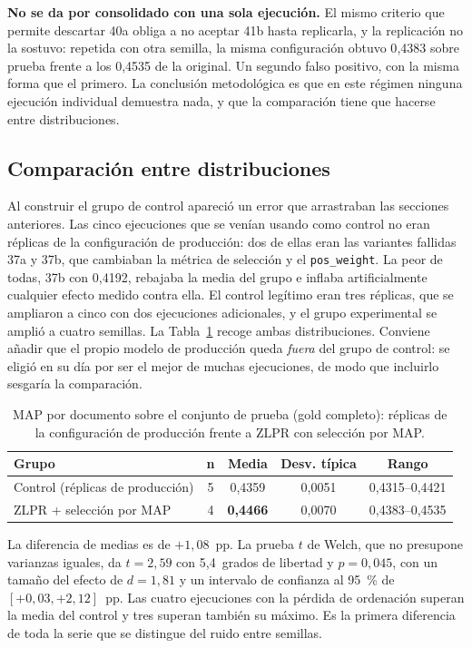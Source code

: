 \textbf{No se da por consolidado con una sola ejecución.} El mismo criterio que permite descartar 40a obliga a no aceptar 41b hasta replicarla, y la replicación no la sostuvo: repetida con otra semilla, la misma configuración obtuvo 0{,}4383 sobre prueba frente a los 0{,}4535 de la original. Un segundo falso positivo, con la misma forma que el primero. La conclusión metodológica es que en este régimen ninguna ejecución individual demuestra nada, y que la comparación tiene que hacerse entre distribuciones.

\subsection{Comparación entre distribuciones}
\label{sec:anexoF-distribuciones}

Al construir el grupo de control apareció un error que arrastraban las secciones anteriores. Las cinco ejecuciones que se venían usando como control no eran réplicas de la configuración de producción: dos de ellas eran las variantes fallidas 37a y 37b, que cambiaban la métrica de selección y el \texttt{pos\_weight}. La peor de todas, 37b con 0{,}4192, rebajaba la media del grupo e inflaba artificialmente cualquier efecto medido contra ella. El control legítimo eran tres réplicas, que se ampliaron a cinco con dos ejecuciones adicionales, y el grupo experimental se amplió a cuatro semillas. La Tabla~\ref{tab:map-distribuciones} recoge ambas distribuciones. Conviene añadir que el propio modelo de producción queda \emph{fuera} del grupo de control: se eligió en su día por ser el mejor de muchas ejecuciones, de modo que incluirlo sesgaría la comparación.

\begin{table}[h]
\centering
\caption{MAP por documento sobre el conjunto de prueba (gold completo): réplicas de la configuración de producción frente a ZLPR con selección por MAP.}
\label{tab:map-distribuciones}
\begin{tabular}{lcccc}
\hline
\textbf{Grupo} & \textbf{n} & \textbf{Media} & \textbf{Desv. típica} & \textbf{Rango} \\
\hline
Control (réplicas de producción) & 5 & 0{,}4359 & 0{,}0051 & 0{,}4315--0{,}4421 \\
ZLPR + selección por MAP & 4 & \textbf{0{,}4466} & 0{,}0070 & 0{,}4383--0{,}4535 \\
\hline
\end{tabular}
\end{table}

La diferencia de medias es de $+1{,}08$~pp. La prueba $t$ de Welch, que no presupone varianzas iguales, da $t = 2{,}59$ con 5{,}4~grados de libertad y $p = 0{,}045$, con un tamaño del efecto de $d = 1{,}81$ y un intervalo de confianza al 95~\% de $[+0{,}03, +2{,}12]$~pp. Las cuatro ejecuciones con la pérdida de ordenación superan la media del control y tres superan también su máximo. Es la primera diferencia de toda la serie que se distingue del ruido entre semillas.


